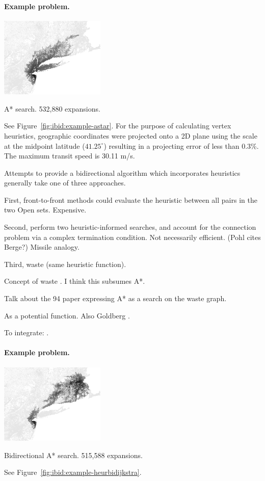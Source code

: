 \paragraph{Example problem.}
\begin{marginfigure}%
   \centering%
   \includegraphics[width=5cm]{figs/incbi-road-ne/singleshot/example-astar.png}%
   \caption{A* search.
      532,880 expansions.}%
   \label{fig:ibid:example-astar}%
\end{marginfigure}
See Figure~\ref{fig:ibid:example-astar}.
For the purpose of calculating vertex heuristics,
geographic coordinates were projected onto a 2D plane using the
scale at the midpoint latitude ($41.25^\circ$)
resulting in a projecting error of less than 0.3\%.
The maximum transit speed is 30.11 m/s.

Attempts to provide a bidirectional algorithm which incorporates
heuristics generally take one of three approaches.

First,
front-to-front methods
could evaluate the heuristic between all pairs in the two
{\sc Open} sets.
Expensive.

Second,
perform two heuristic-informed searches,
and account for the connection problem via a complex
termination condition.
Not necessarily efficient.
(Pohl cites Berge?)
Missile analogy.

Third,
waste (same heuristic function).

Concept of waste \citep{pohl1969bidirectional}.
I think this subsumes A*.

Talk about the 94 paper \citep{ikeda1994betterroutes}
expressing A* as a search on
the waste graph.

As a potential function.
Also Goldberg \citep{goldberg2005spexternalmemory}.

To integrate: \citep{dechter1984bfsastaropt}.

\paragraph{Example problem.}
\begin{marginfigure}%
   \centering%
   \includegraphics[width=5cm]{figs/incbi-road-ne/singleshot/example-heurbidijkstra.png}%
   \caption{Bidirectional A* search.
      515,588 expansions.}%
   \label{fig:ibid:example-heurbidijkstra}%
\end{marginfigure}
See Figure~\ref{fig:ibid:example-heurbidijkstra}.

